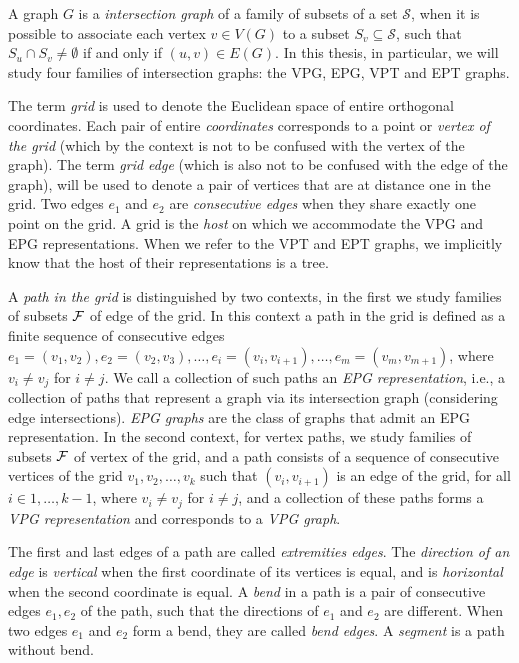 A graph $G$ is a \emph{intersection graph} of a family of subsets of a set $\mathcal{S}$, when it is possible to associate each vertex $v \in V(G)$ to a subset $S_v \subseteq \mathcal{S}$, such that $S_u \cap S_v \neq \emptyset$ if and only if $(u,v)\in E(G)$.  In this thesis, in particular, we will study four families of intersection graphs: the VPG, EPG, VPT and EPT graphs.


The term \emph{grid} is used to denote the Euclidean space of entire orthogonal coordinates. Each pair of entire \emph{coordinates} corresponds to a point or \emph{vertex of the grid} (which by the context is not to be confused with the vertex of the graph). The term \emph{grid edge} (which is also not to be confused with the edge of the graph), will be used to denote a pair of vertices that are at distance one in the grid. Two edges $ e_1 $ and $ e_2 $ are \emph{consecutive edges} when they share exactly one point on the grid. A grid is the \emph{host} on which we accommodate the VPG and EPG representations. When we refer to the VPT and EPT graphs, we implicitly know that the host of their representations is a tree.



 A \emph{path in the grid} is distinguished by two contexts, in the first we study families of subsets $\cal{F}$ of edge of the grid. In this context a path in the grid is defined as a finite sequence of consecutive edges  $e_1 = (v_1, v_{2}), e_2 = (v_2, v_{3}), \dots, e_i = (v_i, v_{i+1}), \dots, e_m = (v_{m}, v_{m+1})$,  where   $v_i \neq v_j$ for $i \neq j$.  We call a collection of such paths an {\it EPG representation}, i.e., a collection of paths that represent a graph via its intersection graph (considering edge intersections). {\it EPG graphs} are the class of graphs that admit an EPG representation.
  In the second context, for vertex paths, we study families of subsets $\cal{F}$ of vertex of the grid, and a path consists of a sequence of consecutive vertices of the grid  $v_1, v_2, \dots , v_k$ such that $(v_i, v_{i+1})$ is an edge of the grid, for all $i \in {1, \dots,  k - 1}$, where   $v_i \neq v_j$ for $i \neq j$, and a collection of these paths forms a {\it VPG representation} and corresponds to a {\it VPG graph}. 

 
 The first and last edges of a path are called \emph{extremities edges}.
The \emph{direction of an edge} is \emph{vertical} when the first coordinate of its vertices is equal, and is \emph{horizontal} when the second coordinate is equal. A \emph {bend} in a path is a pair of consecutive edges $ e_1, e_2 $ of the path, such that the directions of $ e_1 $ and $ e_2 $ are different. When two edges $ e_1 $ and $ e_2 $ form a bend, they are called \emph{bend edges}. A \emph{segment} is a path without bend.
 
